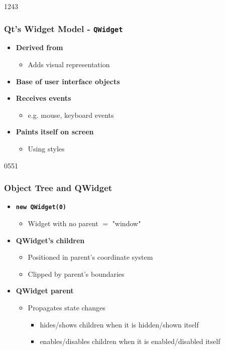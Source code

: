 \begin{slide}{1243}
  \frametitle{Qt's Widget Model - \texttt{QWidget}}
  \begin{itemize}
 \item \textbf{Derived from }
    \begin{itemize}
    \item Adds visual representation
    \end{itemize}
  \item \textbf{Base of user interface objects}
  \item \textbf{Receives events}
    \begin{itemize}
    \item e.g. mouse, keyboard events
    \end{itemize}
  \item \textbf{Paints itself on screen}
    \begin{itemize}
    \item Using styles
    \end{itemize}
\end{itemize}
\end{slide}


\begin{slide}[fragile]{0551}\frametitle{Object Tree and QWidget}
  \begin{itemize}
  \item \textbf{\texttt{new QWidget(0)}}
    \begin{itemize}
    \item Widget with no parent $=$ "window"
    \end{itemize}
  \item \textbf{QWidget's children}
    \begin{itemize}
    \item Positioned in parent's coordinate system
    \item Clipped by parent's boundaries
    \end{itemize}
  \item \textbf{QWidget parent }
    \begin{itemize}
    \item Propagates state changes
      \begin{itemize}
      \item hides/shows children when it is hidden/shown itself
      \item enables/disables children when it is enabled/disabled itself
      \end{itemize}
    \end{itemize}
 \end{itemize}
\end{slide}

